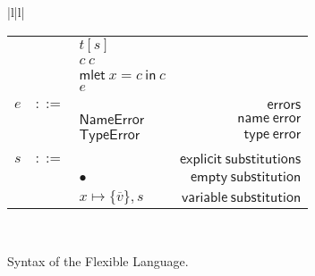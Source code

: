 \documentclass[preprint,authoryear,sort&compress,9pt,nocopyrightspace]{article}
\newcommand{\subx}{x \mapsto \{\overline{v}\},s}
\newcommand{\oletP}[3]{\mathsf{mlet} \ x = #2 \ \mathsf{in}  \ #3}
\newcommand{\nameerror}{\mathsf{NameError}}
\newcommand{\typeerror}{\mathsf{TypeError}}
\newcommand{\semanticA}{Flexible Language}
\begin{document}
\begin{figure}[h]
\begin{small}
\begin{center}
\begin{tabular}{|l|l|}
\begin{tabular}{l c l r}
&&$t[s]$&\\
&&$c \ c $&\\
&&$\oletP {T}{c}{c}$&\\
&&$e$&\\
&&&\\
$e$&$::=$&&$\mathsf {errors}$\\
&&$\nameerror$&$\mathsf {name \ error}$\\
&&$\typeerror$&$\mathsf {type \ error}$\\
&&&\\
$s$&$::=$&&$\mathsf {explicit \ substitutions}$\\
&&$ \bullet$&$\mathsf {empty \ substitution}$\\
&&$\subx$&$\mathsf {variable \ substitution}$\\
\end{tabular}\\
\hline
\end{tabular}
\hspace*{-2cm}
\caption{Syntax of the \semanticA.}
\label{figure:sintax1}
\end{center}
\end{small}
\end{figure}
\end{document}
